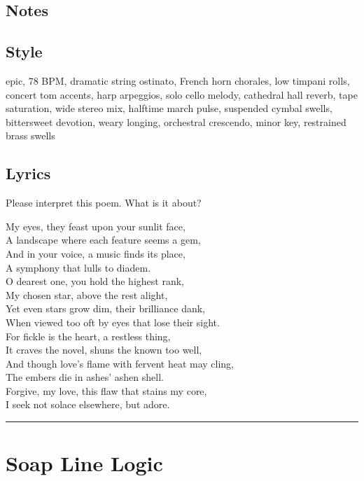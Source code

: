 \subsection{Notes}\label{notes-27}

\subsection{Style}\label{style-26}

epic, 78 BPM, dramatic string ostinato, French horn chorales, low
timpani rolls, concert tom accents, harp arpeggios, solo cello melody,
cathedral hall reverb, tape saturation, wide stereo mix, halftime march
pulse, suspended cymbal swells, bittersweet devotion, weary longing,
orchestral crescendo, minor key, restrained brass swells

\subsection{Lyrics}\label{lyrics-26}

Please interpret this poem. What is it about?

My eyes, they feast upon your sunlit face,\\
A landscape where each feature seems a gem,\\
And in your voice, a music finds its place,\\
A symphony that lulls to diadem.\\
O dearest one, you hold the highest rank,\\
My chosen star, above the rest alight,\\
Yet even stars grow dim, their brilliance dank,\\
When viewed too oft by eyes that lose their sight.\\
For fickle is the heart, a restless thing,\\
It craves the novel, shuns the known too well,\\
And though love's flame with fervent heat may cling,\\
The embers die in ashes' ashen shell.\\
Forgive, my love, this flaw that stains my core,\\
I seek not solace elsewhere, but adore.

\begin{center}\rule{0.5\linewidth}{0.5pt}\end{center}

\section{Soap Line Logic}\label{soap-line-logic}

